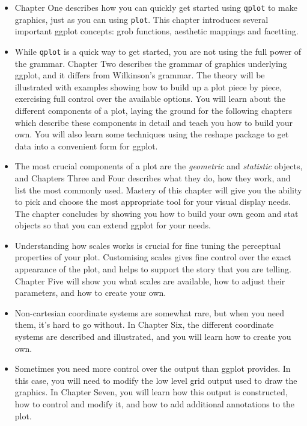\documentclass[oneside,letterpaper]{scrartcl}
\begin{document}
\begin{itemize}
	\item Chapter One describes how you can quickly get started using {\tt qplot} to make graphics, just as you can using {\tt plot}.  This chapter introduces several important ggplot concepts: grob functions, aesthetic mappings and facetting.
	
	\item While {\tt qplot} is a quick way to get started, you are not using the full power of the grammar.  Chapter Two describes the grammar of graphics underlying ggplot, and it differs from Wilkinson's grammar.  The theory will be illustrated with examples showing how to build up a plot piece by piece, exercising full control over the available options.  You will learn about the different components of a plot, laying the ground for the following chapters which describe these components in detail and teach you how to build your own.  You will also learn some techniques using the reshape package to get data into a convenient form for ggplot.

	\item The most crucial components of a plot are the {\em geometric} and {\em statistic} objects, and Chapters Three and Four describes what they do, how they work, and list the most commonly used.  Mastery of this chapter will give you the ability to pick and choose the most appropriate tool for your visual display needs.  The chapter concludes by showing you how to build your own geom and stat objects so that you can extend ggplot for your needs.

	\item Understanding how scales works is crucial for fine tuning the perceptual properties of your plot.  Customising scales gives fine control over the exact appearance of the plot, and helps to support the story that you are telling.  Chapter Five will show you what scales are available, how to adjust their parameters, and how to create your own.

	\item Non-cartesian coordinate systems are somewhat rare, but when you need them, it's hard to go without.  In Chapter Six, the different coordinate systems are described and illustrated, and you will learn how to create you own.
	
	\item Sometimes you need more control over the output than ggplot provides.  In this case, you will need to modify the low level grid output used to draw the graphics.  In Chapter Seven, you will learn how this output is constructed, how to control and modify it, and how to add additional annotations to the plot.

\end{itemize}
\end{document}
